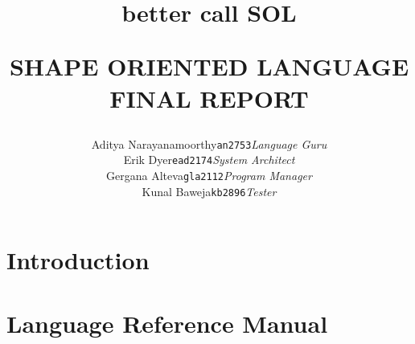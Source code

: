 \documentclass[letterpaper,12pt]{report}
\begin{document}
\title{{\small better call} {\Huge \textbf{SOL}}\\
    \begin{center}{SHAPE ORIENTED LANGUAGE FINAL REPORT}\end{center}
}

\author{
\begin{tabular}{ lc lc lc }
Aditya Narayanamoorthy & \texttt{an2753}  & \textit{Language Guru}    \\
Erik Dyer              & \texttt{ead2174} & \textit{System Architect} \\
Gergana Alteva         & \texttt{gla2112} & \textit{Program Manager}  \\
Kunal Baweja           & \texttt{kb2896}  & \textit{Tester}
\end{tabular}
}

\maketitle

\tableofcontents{}

\chapter{Introduction}


\chapter{Language Reference Manual}


\end{document}
